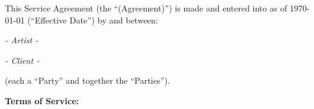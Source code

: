 {\LARGE\textbf{\docmaintitle}}
\par \vspace{1cm}
This Service Agreement (the \enquote{(Agreement)}) is made and entered into as 
of \today{} (\enquote{Effective Date}) by and between:
\par \vspace{0.25cm}

\textbf{\doclicensor} \newline 
\doclicensoradress \newline 
\textit{- Artist -}
\par \vspace{0.25cm}
 
\textbf{\doclicensee} \newline 
\doclicenseeadress \newline 
\textit{- Client -}
\par \vspace{0.25cm}
(each a \enquote{Party} and together the \enquote{Parties}).
\par \vspace{0.5cm}

\textbf{Terms of Service:}
